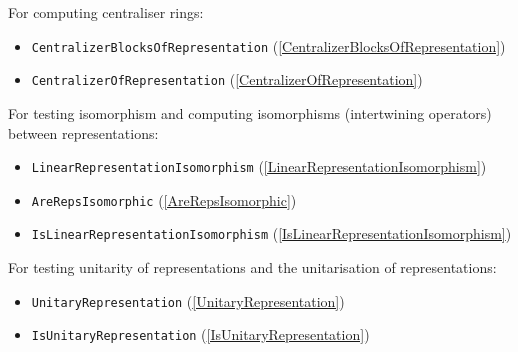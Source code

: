 \documentclass[a4paper,11pt]{report}
\begin{document}
{{ For computing centraliser rings: 

 
\begin{itemize}
\item  \texttt{CentralizerBlocksOfRepresentation} (\ref{CentralizerBlocksOfRepresentation}) 
\item  \texttt{CentralizerOfRepresentation} (\ref{CentralizerOfRepresentation}) 
\end{itemize}
 

 For testing isomorphism and computing isomorphisms (intertwining operators)
between representations: 

 
\begin{itemize}
\item  \texttt{LinearRepresentationIsomorphism} (\ref{LinearRepresentationIsomorphism}) 
\item  \texttt{AreRepsIsomorphic} (\ref{AreRepsIsomorphic}) 
\item  \texttt{IsLinearRepresentationIsomorphism} (\ref{IsLinearRepresentationIsomorphism}) 
\end{itemize}
 

 For testing unitarity of representations and the unitarisation of
representations: 

 
\begin{itemize}
\item  \texttt{UnitaryRepresentation} (\ref{UnitaryRepresentation}) 
\item  \texttt{IsUnitaryRepresentation} (\ref{IsUnitaryRepresentation}) 
\end{itemize}
 }

 }

   
\end{document}
